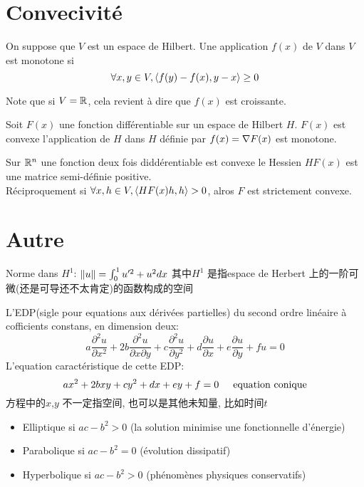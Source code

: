 \documentclass[openany]{book}
\begin{document}
\section{Convecivit\'e}
\begin{definition}
		On suppose que $V$ est un espace de Hilbert. Une application $f(x)$ de $V$ dans $V$ est monotone si
		$$
		\forall x,y \in V, \langle f(y)-f(x) , y-x\rangle \geq 0
		$$
\end{definition}
Note que si $V=\mathbb{R}$, cela revient \`a dire que $f(x)$ est croissante.

\begin{theorem}
		Soit $F(x)$ une fonction diff\'erentiable sur un espace de Hilbert $H$. $F(x)$ est convexe \ssi l'application de $H$ dans $H$ d\'efinie par $f(x) = \nabla F(x)$ est monotone.
\end{theorem}

\begin{theorem}
		Sur $\mathbb{R}^n$ une fonction deux fois didd\'erentiable est convexe \ssi le Hessien $HF(x)$ est une matrice semi-d\'efinie positive.\\
		R\'eciproquement si $\forall x,h \in V, \langle HF(x)h , h\rangle>0$, alros $F$ est strictement convexe.
\end{theorem}

\section{Autre}
Norme dans $H^1$: $\left\Vert u\right\Vert = \int_0^1 u'^2 + u^2 dx$\newline
其中$H^1$ 是指espace de Herbert 上的一阶可微(还是可导还不太肯定)的函数构成的空间


L'EDP(sigle pour equations aux d\'eriv\'ees partielles) du second ordre lin\'eaire \`a cofficients constans, en dimension deux:
\begin{equation}
		a \frac{\partial^2 u}{\partial x^2} +
		2b \frac{\partial^2 u}{\partial x \partial y} +
		c \frac{\partial^2 u}{\partial y^2} +
		d \frac{\partial u}{\partial x} +
		e \frac{\partial u}{\partial y} +
		fu
		=0
\end{equation}
L'equation caract\'eristique de cette EDP:
\begin{equation}
		ax^2 + 2bxy + cy^2 + dx + ey + f = 0 \hspace{0.5cm} \text{equation conique}
\end{equation}
方程中的$x$,$y$ 不一定指空间, 也可以是其他未知量, 比如时间$t$

\begin{itemize}
		\item Elliptique si $ac - b^2 > 0$ (la solution minimise une fonctionnelle d'\'energie)
		\item Parabolique si $ac - b^2 = 0$ (\'evolution dissipatif)
		\item Hyperbolique si $ac - b^2 > 0$ (ph\'enom\`enes physiques conservatifs)
\end{itemize}
\end{document}
